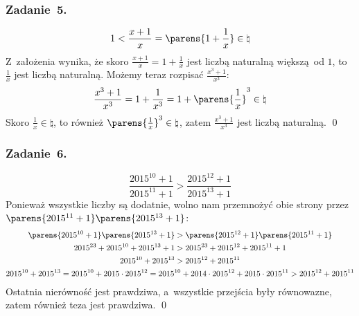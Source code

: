 \subsubsection*{Zadanie~5.}
\begin{equation*}
    1 < \frac{x + 1}{x} = \parens{1 + \frac{1}{x}} \in \natural
\end{equation*}
Z~założenia wynika, że skoro \(\frac{x + 1}{x} = 1 + \frac{1}{x}\) jest liczbą naturalną większą od \(1\), to \(\frac{1}{x}\) jest liczbą naturalną. Możemy teraz rozpisać \(\frac{x^3 + 1}{x^3}\):
\begin{equation*}
    \frac{x^3 + 1}{x^3} = 1 + \frac{1}{x^3} = 1 + \parens{\frac{1}{x}}^3 \in \natural
\end{equation*}
Skoro \(\frac{1}{x} \in \natural\), to również \(\parens{\frac{1}{x}}^3 \in \natural\), zatem \(\frac{x^3 + 1}{x^3}\) jest liczbą naturalną.
\qed
\subsubsection*{Zadanie~6.}
\begin{equation*}
    \frac{2015^{10} + 1}{2015^{11} + 1} > \frac{2015^{12} + 1}{2015^{13} + 1}
\end{equation*}
Ponieważ wszystkie liczby są dodatnie, wolno nam przemnożyć obie strony przez \(\parens{2015^{11} + 1}\parens{2015^{13} + 1}\):
\begin{gather*}
    \parens{2015^{10} + 1}\parens{2015^{13} + 1} > \parens{2015^{12} + 1}\parens{2015^{11} + 1}\\
    2015^{23} + 2015^{10} + 2015^{13} + 1 > 2015^{23} + 2015^{12} + 2015^{11} + 1\\
    2015^{10} + 2015^{13} > 2015^{12} + 2015^{11}\\
    2015^{10} + 2015^{13} = 2015^{10} + 2015 \cdot 2015^{12} = 2015^{10} + 2014 \cdot 2015^{12} + 2015 \cdot 2015^{11} > 2015^{12} + 2015^{11}
\end{gather*}
Ostatnia nierówność jest prawdziwa, a~wszystkie przejścia były równowazne, zatem również teza jest prawdziwa.
\qed
